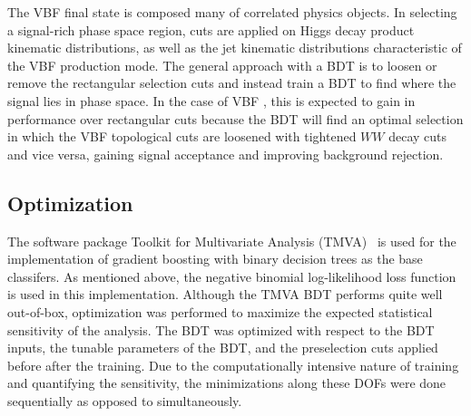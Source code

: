 The VBF \hwwlnln final state is composed many of correlated physics
objects. In selecting a signal-rich phase space region, cuts are
applied on Higgs decay product kinematic distributions, as well as the
jet kinematic distributions characteristic of the VBF production
mode. The general approach with a BDT is to loosen or remove the
rectangular selection cuts and instead train a BDT to find where the
signal lies in phase space. In the case of VBF \hwwlnln, this is expected
to gain in performance over rectangular cuts
because the BDT will find an optimal selection in which the VBF
topological cuts are loosened with tightened $WW$ decay cuts and vice
versa, gaining signal acceptance and improving background rejection. 

\subsection{Optimization}

The software package Toolkit for Multivariate Analysis
(TMVA)~\cite{bib:Therhaag:2009dp} is used for
the implementation of gradient boosting with binary decision trees as the
base classifers. As mentioned above, the negative binomial
log-likelihood loss function is used in this implementation. Although
the TMVA BDT performs quite well out-of-box, optimization was
performed to maximize the expected statistical sensitivity of the
analysis. The BDT was optimized with respect to the BDT inputs, the
tunable parameters of the BDT, and the
preselection cuts applied before after the training. Due to the
computationally intensive nature of training and quantifying the
sensitivity, the minimizations along these DOFs were done sequentially
as opposed to simultaneously. 

